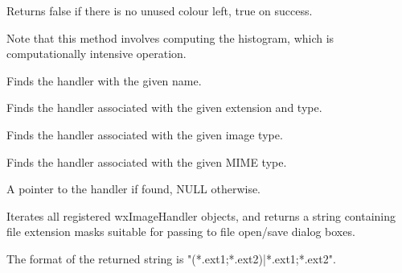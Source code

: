 
Returns false if there is no unused colour left, true on success.


Note that this method involves computing the histogram, which is
computationally intensive operation.


\label{wximagefindhandler}


Finds the handler with the given name.


Finds the handler associated with the given extension and type.


Finds the handler associated with the given image type.


Finds the handler associated with the given MIME type.






A pointer to the handler if found, NULL otherwise.




\label{wximagegetimageextwildcard}


Iterates all registered wxImageHandler objects, and returns a string containing file extension masks
suitable for passing to file open/save dialog boxes.


The format of the returned string is "(*.ext1;*.ext2)|*.ext1;*.ext2".

